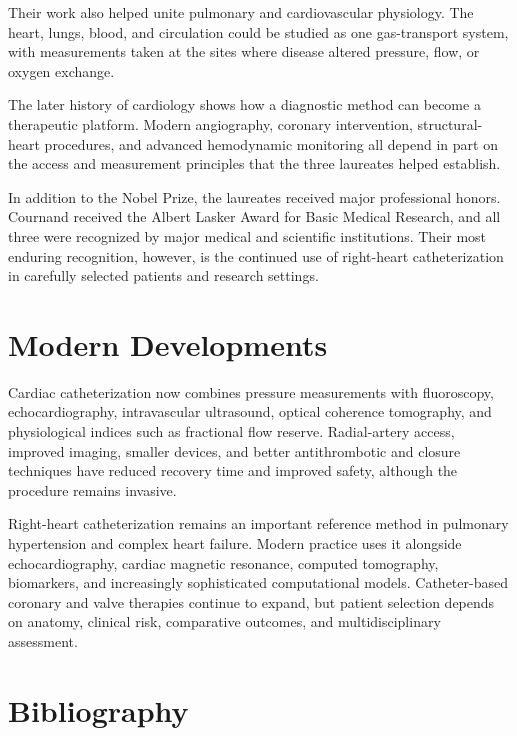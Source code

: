 Their work also helped unite pulmonary and cardiovascular physiology. The heart, lungs, blood, and circulation could be studied as one gas-transport system, with measurements taken at the sites where disease altered pressure, flow, or oxygen exchange.

The later history of cardiology shows how a diagnostic method can become a therapeutic platform. Modern angiography, coronary intervention, structural-heart procedures, and advanced hemodynamic monitoring all depend in part on the access and measurement principles that the three laureates helped establish.

In addition to the Nobel Prize, the laureates received major professional honors. Cournand received the Albert Lasker Award for Basic Medical Research, and all three were recognized by major medical and scientific institutions. Their most enduring recognition, however, is the continued use of right-heart catheterization in carefully selected patients and research settings.

\section{Modern Developments}

Cardiac catheterization now combines pressure measurements with fluoroscopy, echocardiography, intravascular ultrasound, optical coherence tomography, and physiological indices such as fractional flow reserve. Radial-artery access, improved imaging, smaller devices, and better antithrombotic and closure techniques have reduced recovery time and improved safety, although the procedure remains invasive.

Right-heart catheterization remains an important reference method in pulmonary hypertension and complex heart failure. Modern practice uses it alongside echocardiography, cardiac magnetic resonance, computed tomography, biomarkers, and increasingly sophisticated computational models. Catheter-based coronary and valve therapies continue to expand, but patient selection depends on anatomy, clinical risk, comparative outcomes, and multidisciplinary assessment.

\section{Bibliography}

